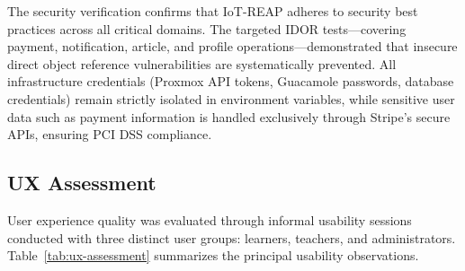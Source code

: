 The security verification confirms that IoT-REAP adheres to security best practices across all critical domains. The targeted IDOR tests---covering payment, notification, article, and profile operations---demonstrated that insecure direct object reference vulnerabilities are systematically prevented. All infrastructure credentials (Proxmox API tokens, Guacamole passwords, database credentials) remain strictly isolated in environment variables, while sensitive user data such as payment information is handled exclusively through Stripe's secure APIs, ensuring PCI DSS compliance.

\subsection{UX Assessment}

User experience quality was evaluated through informal usability sessions conducted with three distinct user groups: learners, teachers, and administrators. Table~\ref{tab:ux-assessment} summarizes the principal usability observations.

